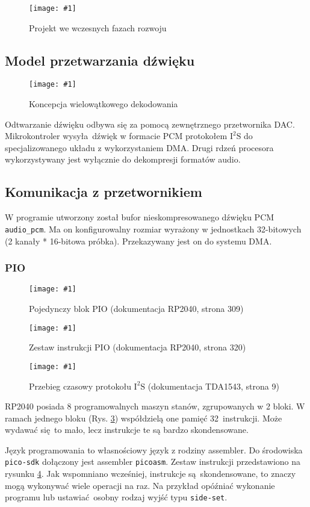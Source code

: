 \documentclass[12pt]{report}
\newcommand{\imgint}[4]{
	\begin{figure}[{#4}]
		\centering
		\texttt{[image: \#1]}
		\caption{#2}
		\label{#1}
	\end{figure}
}
\newcommand{\imgcs}[3]{\imgint{#1}{#2}{#3}{}}
\newcommand{\isqs}{$\text{I}^{2}\text{S}$}
\newcommand{\sset}{\lstinline|side-set|}
\begin{document}
	\imgcs{3/pr_wav}{Projekt we wczesnych fazach rozwoju}{0.45}
	
	\subsection{Model przetwarzania dźwięku}
	
	\imgcs{3/pipeline}{Koncepcja wielowątkowego dekodowania}{0.8}
	
	Odtwarzanie dźwięku odbywa się za pomocą zewnętrznego przetwornika DAC. Mikrokontroler wysyła dźwięk w formacie PCM protokołem \isqs{} do specjalizowanego układu z wykorzystaniem DMA. Drugi rdzeń procesora wykorzystywany jest wyłącznie do dekompresji formatów audio.
	
	
	\subsection{Komunikacja z przetwornikiem}
	W programie utworzony został bufor nieskompresowanego dźwięku PCM \lstinline|audio_pcm|. Ma on konfigurowalny rozmiar wyrażony w jednostkach 32-bitowych (2 kanały * 16-bitowa próbka). Przekazywany jest on do systemu DMA.
	
	\subsubsection{PIO}
		\imgcs{3/pio_block}{Pojedynczy blok PIO (dokumentacja RP2040\textsuperscript{\cite{pico_pdf}}, strona 309)}{0.7}
		\imgcs{3/pio_instr}{Zestaw instrukcji PIO (dokumentacja RP2040, strona 320)}{0.7}
		\imgcs{3/pio_i2s_docs}{Przebieg czasowy protokołu \isqs{} (dokumentacja TDA1543\textsuperscript{\cite{tda_pdf}}, strona 9)}{0.9}
		
		RP2040 posiada 8 programowalnych maszyn stanów, zgrupowanych w 2 bloki. W ramach jednego bloku (Rys. \ref{3/pio_block}) współdzielą one pamięć 32 instrukcji. Może wydawać się to mało, lecz instrukcje te są bardzo skondensowane.
		
		Język programowania to własnościowy język z rodziny assembler. Do środowiska \lstinline|pico-sdk| dołączony jest assembler \lstinline|picoasm|. Zestaw instrukcji przedstawiono na rysunku \ref{3/pio_instr}. Jak wspomniano wcześniej, instrukcje są skondensowane, to znaczy mogą wykonywać wiele operacji na raz. Na przykład opóźniać wykonanie programu lub ustawiać osobny rodzaj wyjść typu \sset{}.
		
\end{document}
